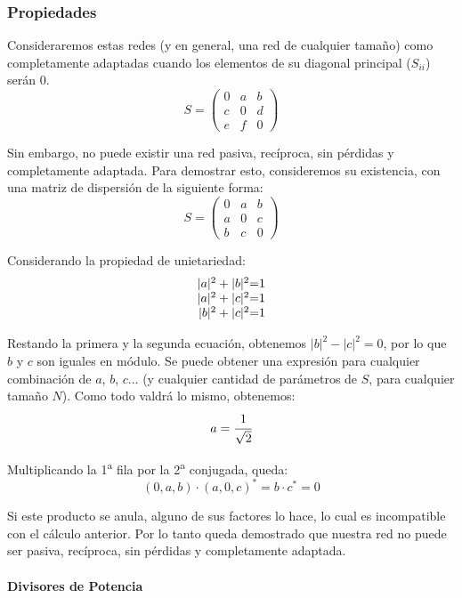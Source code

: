 \documentclass[12pt]{article}
\begin{document}
\subsubsection{Propiedades}

Consideraremos estas redes (y en general, una red de cualquier tama\~no) como completamente adaptadas cuando los elementos de su diagonal principal ($S_{ii}$) ser\'an 0.
$$S = \left(\begin{array}{ccc}
	0 & a & b \\
	c & 0 & d \\
	e & f & 0
\end{array}\right)$$

Sin embargo, no puede existir una red pasiva, rec\'iproca, sin p\'erdidas y completamente adaptada. Para demostrar esto, consideremos su existencia, con una matriz de dispersi\'on de la siguiente forma:
$$S = \left(\begin{array}{ccc}
	0 & a & b \\
	a & 0 & c \\
	b & c & 0
\end{array}\right)$$

Considerando la propiedad de unietariedad:
$$\begin{array}{r@{=}l}
	|a|^2 + |b|^2 & 1 \\
	|a|^2 + |c|^2 & 1 \\
	|b|^2 + |c|^2 & 1
\end{array}$$

Restando la primera y la segunda ecuaci\'on, obtenemos $|b|^2 - |c|^2 = 0$, por lo que $b$ y $c$ son iguales en m\'odulo. Se puede obtener una expresi\'on para cualquier combinaci\'on de $a$, $b$, $c\ldots$ (y cualquier cantidad de par\'ametros de $S$, para cualquier tama\~no $N$). Como todo valdr\'a lo mismo, obtenemos:
$$a = \cfrac{1}{\sqrt{2}}$$

Multiplicando la 1\textsuperscript{a} fila por la 2\textsuperscript{a} conjugada, queda:
$$(0, a, b) \cdot (a, 0, c)^* = b \cdot c^* = 0$$

Si este producto se anula, alguno de sus factores lo hace, lo cual es incompatible con el c\'alculo anterior. Por lo tanto queda demostrado que nuestra red no puede ser pasiva, rec\'iproca, sin p\'erdidas y completamente adaptada.

\paragraph{Divisores de Potencia}
\end{document}
